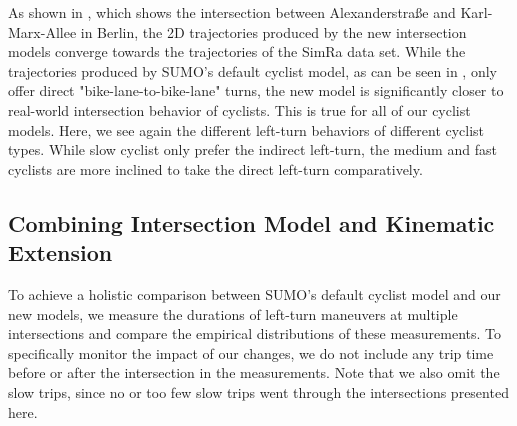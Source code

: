 As shown in , which shows the intersection between Alexanderstraße and Karl-Marx-Allee in Berlin, the 2D trajectories produced by the new intersection models converge towards the trajectories of the SimRa data set.
While the trajectories produced by SUMO's default cyclist model, as can be seen in , only offer direct "bike-lane-to-bike-lane" turns, the new model is significantly closer to real-world intersection behavior of cyclists.
This is true for all of our cyclist models.
Here, we see again the different left-turn behaviors of different cyclist types.
While slow cyclist only prefer the indirect left-turn, the medium and fast cyclists are more inclined to take the direct left-turn comparatively.

\subsection{Combining Intersection Model and Kinematic Extension}
\label{subsec:combinin_intersection_model_and_kinematic_extension}
To achieve a holistic comparison between SUMO's default cyclist model and our new models, we measure the durations of left-turn maneuvers at multiple intersections and compare the empirical distributions of these measurements.
To specifically monitor the impact of our changes, we do not include any trip time before or after the intersection in the measurements.
Note that we also omit the slow trips, since no or too few slow trips went through the intersections presented here.

